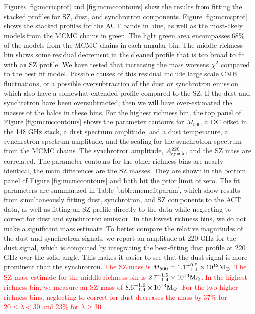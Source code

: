 \documentclass[a4paper,fleqn,usenatbib]{mnras}
\newcommand{\revisit}{\textcolor{red}}
\begin{document}
Figures \ref{fig:mcmcprof} and \ref{fig:mcmccontours} show the results from fitting the stacked profiles for SZ, dust, and synchrotron components. 
Figure \ref{fig:mcmcprof} shows the stacked profiles for the ACT bands in blue, as well as the most-likely models from the MCMC chains in green. 
The light green area encompasses 68\% of the models from the MCMC chains in each annular bin.  
The middle richness bin shows some residual decrement in the cleaned profile that is too broad to fit with an SZ profile.  
We have tested that increasing the mass worsens $\chi^2$ compared to the best fit model.  
Possible causes of this residual include large scale CMB fluctuations, or a possible oversubtraction of the dust or synchrotron emission which also have a somewhat extended profile compared to the SZ.  
If the dust and synchrotron have been oversubtracted, then we will have over-estimated the masses of the halos in these bins.
For the highest richness bin, the top panel of Figure \ref{fig:mcmccontours} shows the parameter contours for $M_{500}$, a DC offset in the 148 GHz stack, a dust spectrum amplitude, and a dust temperature, a synchrotron spectrum amplitude, and the scaling for the synchrotron spectrum from the MCMC chains. 
The synchrotron amplitude, $A^{220}_{\rm synch}$, and the SZ mass are correlated. 
The parameter contours for the other richness bins are nearly identical, the main differences are the SZ masses.
They are shown in the bottom panel of Figure \ref{fig:mcmccontours} and both hit the prior limit of zero.
The fit parameters are summarized in Table \ref{table:mcmcfitparam}, which show results from simultaneously fitting dust, synchrotron, and SZ components to the ACT data, as well as fitting an SZ profile directly to the data while neglecting to correct for dust and synchrotron emission. 
In the lowest richness bins, we do not make a significant mass estimate.
To better compare the relative magnitudes of the dust and synchrotron signals, we report an amplitude at 220 GHz for the dust signal, which is computed by integrating the best-fitting dust profile at 220 GHz over the solid angle.
This makes it easier to see that the dust signal is more prominent than the synchrotron.
\revisit{The SZ mass is $M_{500} = 1.1^{+0.5}_{-1.1} \times 10^{13} \rm M_{\odot}$. 
The SZ mass estimate for the middle richness bin is $2.7^{+1.5}_{-1.4} \times 10^{13} \rm M_{\odot}$. 
In the highest richness bin, we measure an SZ mass of $8.6^{+1.6}_{-1.4} \times 10^{13} \rm M_{\odot}$. 
For the two higher richness bins, neglecting to correct for dust decreases the mass by 37\% for $20 \leq \lambda < 30$ and 23\% for $\lambda \geq 30$.}
\end{document}
